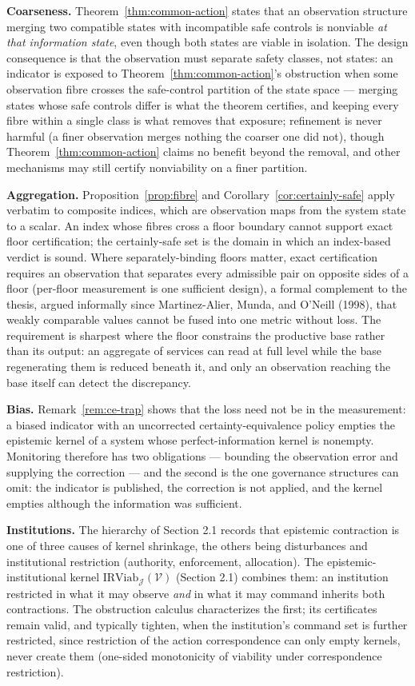 \documentclass[10pt,twocolumn]{article}
\theoremstyle{definition}
\begin{document}
\textbf{Coarseness.} Theorem~\ref{thm:common-action} states that an observation structure
merging two compatible states with incompatible safe controls is
nonviable \emph{at that information state}, even though both states are
viable in isolation. The design consequence is that the observation must
separate safety classes, not states: an indicator is exposed to Theorem~\ref{thm:common-action}'s obstruction when some observation fibre crosses the safe-control
partition of the state space --- merging states whose safe controls differ is what the theorem certifies, and keeping every fibre within a single class is what removes that exposure; refinement is never harmful (a finer observation merges nothing the coarser one did not), though Theorem~\ref{thm:common-action}
claims no benefit beyond the removal, and other mechanisms may still
certify nonviability on a finer partition.

\textbf{Aggregation.} Proposition~\ref{prop:fibre} and Corollary~\ref{cor:certainly-safe} apply verbatim to
composite indices, which are observation maps from the system state to a
scalar. An index whose fibres cross a floor boundary cannot support
exact floor certification; the certainly-safe set is the domain in which an index-based verdict is sound. Where separately-binding floors matter, exact
certification requires an observation that separates every admissible
pair on opposite sides of a floor (per-floor measurement is one sufficient design), a formal complement to the thesis, argued informally since Martinez-Alier, Munda, and O'Neill (1998), that weakly comparable
values cannot be fused into one metric without loss. The requirement is
sharpest where the floor constrains the productive base rather than its
output: an aggregate of services can read at full level while the base
regenerating them is reduced beneath it, and only an observation
reaching the base itself can detect the discrepancy.

\textbf{Bias.} Remark~\ref{rem:ce-trap} shows that the loss need not be in the
measurement: a biased indicator with an uncorrected
certainty-equivalence policy empties the epistemic kernel of a system
whose perfect-information kernel is nonempty. Monitoring therefore has
two obligations --- bounding the observation error and supplying the
correction --- and the second is the one governance structures can omit: the indicator is published, the correction is not applied,
and the kernel empties although the information was sufficient.

\textbf{Institutions.} The hierarchy of Section 2.1 records that
epistemic contraction is one of three causes of kernel shrinkage, the
others being disturbances and institutional restriction (authority,
enforcement, allocation). The epistemic-institutional kernel \(\mathrm{IRViab}_{\mathcal{J}}(\mathcal{V})\) (Section 2.1) combines them: an institution restricted in what it
may observe \emph{and} in what it may command inherits both
contractions. The obstruction calculus characterizes the first; its certificates remain valid, and typically tighten, when the institution's command set is further restricted, since restriction of
the action correspondence can only empty kernels, never create them
(one-sided monotonicity of viability under correspondence restriction).
\end{document}
